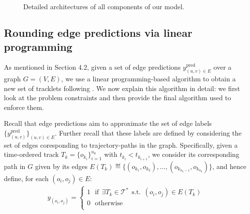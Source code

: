 \documentclass[10pt,twocolumn,letterpaper]{article}
\begin{document}
{{\begin{figure*}[t!]
        \centering
           
\caption{Detailed architectures of all components of our model.} \label{model_arch}
\end{figure*}    


\subsection{Rounding edge predictions via linear programming}

As mentioned in Section 4.2, given a set of edge predictions $y^{\text{pred}}_{(u, v)\in E}$ over a graph $G=(V, E)$, we use a linear programming-based algorithm to obtain a new set of tracklets following \cite{mpntrack}. We now explain this algorithm in detail: we first look at the problem constraints and then provide the final algorithm used to enforce them.

 Recall that edge predictions aim to approximate the set of edge labels $\{y^{\text{pred}}_{(u, v)}\}_{(u, v)\in E}$. Further recall that these labels are defined by considering the set of edges coresponding to trajectory-paths in the graph. Specifically, given a time-ordered track $T_k=\{o_{k_i}\}_{i=1}^{n_k}$ with $t_{k_i}< t_{k_{i+1}}$, we consider its corresponding path in $G$ given by its edges $E(T_k) \eqdef\{(o_{k_1}, o_{k_2}), \dots, (o_{k_{n_k - 1}}, o_{k_{n_k}}) \}$, and hence define, for each $(o_i, o_j) \in E$:
\begin{align}
    y_{(o_i, o_j)} = \begin{cases} 1 \ \ \  \text{if} \ \ \exists T_k\in \mathcal{T}^* \ \ \text{s.t.} \ \  (o_i, o_j) \in E(T_k)  \\
0  \ \ \ \text{otherwise}\\
\end{cases}
\end{align}

}}
\end{document}
